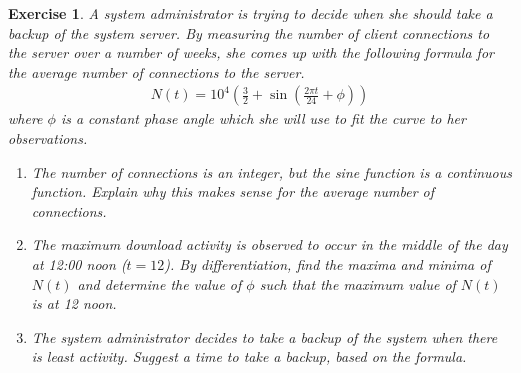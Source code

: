 \documentclass{book}
\newtheorem{exercise}{Exercise}
\def\beq{\begin{eqnarray}}
\def\eeq{\end{eqnarray}}
\begin{document}
\begin{solution}
\end{solution}

\begin{exercise} 
A system administrator is trying to decide when she should take a backup of
the system server. By measuring the number of client connections to the server
over a number of weeks, she comes up with the following formula for the {\rm average}
number of connections to the server.
\beq
N(t) = 10^4 \left(\frac{3}{2}+\sin\left(
\frac{2\pi t}{24}+\phi
\right)\right)
\eeq
where $\phi$ is a constant phase angle which she will use to fit the curve to
her observations.
\begin{enumerate}
\item The number of connections is an integer, but the sine function is a continuous
function. Explain why this makes sense for the average number of connections.

\item The maximum download activity is observed to occur in the middle of the
day at 12:00 noon ($t=12$). By differentiation, find the maxima and minima of
$N(t)$ and determine the value of $\phi$ such that the maximum value of
$N(t)$ is at 12 noon.

\item The system administrator decides to take a backup of the system when there
is least activity. Suggest a time to take a
backup, based on the formula.

\end{enumerate}
\end{exercise}
\begin{solution}
\end{solution}
\end{document}
